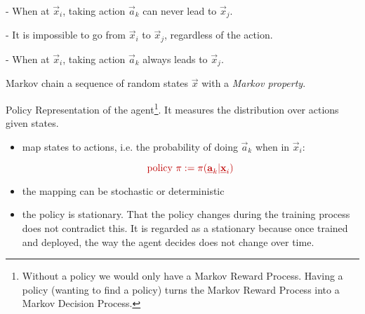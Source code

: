 \begin{frame}
\pause

- When at $\vec x_i$, taking action $\vec a_k$ can never lead to $\vec x_j$.



\pause

- It is impossible to go from $\vec x_i$ to $\vec x_j$, regardless of the action.


\pause

- When at $\vec x_i$, taking action $\vec a_k$ always leads to $\vec x_j$.

\end{frame}

\begin{frame}


\begin{block}{Markov chain}
a sequence of random states $\vec x$ with a \emph{Markov property}.
\end{block}


\end{frame}

\begin{frame}

\begin{block}{\textcolor{policy}{Policy}}
Representation of the agent\footnote{
Without a policy we would only have a Markov Reward Process.
Having a policy (wanting to find a policy) turns the Markov Reward Process into a Markov Decision Process.
}. It measures the distribution over actions given states.
\begin{itemize}
\item map states to actions, i.e. the probability of doing $\vec a_k$ when in $\vec x_i$:

\begin{equation}
\color{policy}
\text{policy }\pi := \pi(\vec a_k | \vec x_i)
\end{equation}
\item the mapping can be stochastic or deterministic
\item the policy is stationary. That the policy changes during the training process does not contradict this.
It is regarded as a stationary because once trained and deployed, the way the agent decides does not change over time.
\end{itemize}

\end{block}

\end{frame}
